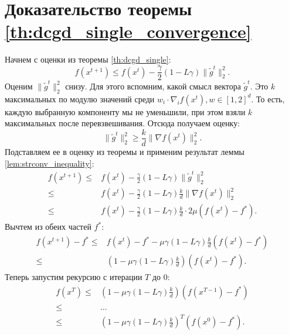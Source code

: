 \section{Доказательство теоремы \ref{th:dcgd_single_convergence}} \label{app:dcgd_single_convergence_proof}
    Начнем с оценки из теоремы \ref{th:dcgd_single}:
    \begin{equation*}
        f(x^{t + 1}) \leq f(x^t) - \frac{\gamma}{2} (1 - L \gamma) \|\tilde{g}^t\|_2^2.
    \end{equation*}
    Оценим $\|\tilde{g}^t\|_2^2$ снизу. Для этого вспомним, какой смысл вектора $\tilde{g}^t$. Это $k$ максимальных по модулю значений среди $w_i \cdot \nabla_i f(x^t), w \in [1, 2]^d$. То есть, каждую выбранную компоненту мы не уменьшили, при этом взяли $k$ максимальных после перевзвешивания. Отсюда получаем оценку:
    \begin{equation*}
        \|\tilde{g}^t\|_2^2 \geq \frac{k}{d} \|\nabla f(x^t)\|_2^2.
    \end{equation*}
    Подставляем ее в оценку из теоремы и применим результат леммы \ref{lem:strconv_inequality}:
    \begin{align*}
        f(x^{t + 1}) \leq& f(x^t) - \frac{\gamma}{2} (1 - L \gamma) \|\tilde{g}^t\|_2^2 \\
        \leq& f(x^t) - \frac{\gamma}{2} (1 - L \gamma) \frac{k}{d} \|\nabla f(x^t)\|_2^2 \\
        \leq& f(x^t) - \frac{\gamma}{2} (1 - L \gamma) \frac{k}{d} \cdot 2\mu (f(x^t) - f^*).
    \end{align*}
    Вычтем из обеих частей $f^*$:
    \begin{align*}
        f(x^{t + 1}) - f^* \leq& f(x^t) - f^* - \mu \gamma (1 - L \gamma) \frac{k}{d} (f(x^t) - f^*)\\
        \leq& \left(1 - \mu\gamma (1 - L \gamma)\frac{k}{d}\right) (f(x^t) - f^*).
    \end{align*}
    Теперь запустим рекурсию с итерации $T$ до 0:
    \begin{align*}
        f(x^T) \leq& \left(1 - \mu\gamma (1 - L \gamma)\frac{k}{d}\right) (f(x^{T - 1}) - f^*) \\
        \leq& \ldots \\
        \leq& \left(1 - \mu\gamma (1 - L \gamma)\frac{k}{d}\right)^T (f(x^0) - f^*).
    \end{align*}
